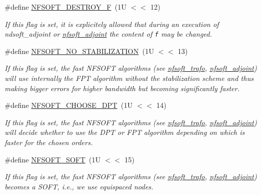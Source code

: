 \begin{CompactItemize}
\#define \hyperlink{group__nfsoft_g93ab283dcb14d5b37b130e2556bb6e7d}{NFSOFT\_\-DESTROY\_\-F}~(1U $<$$<$ 12)
\begin{CompactList}\small\item\em If this flag is set, it is explicitely allowed that during an execution of ndsoft\_\-adjoint or \hyperlink{group__nfsoft_g08395b1dd90f9a2565685d17460afc5b}{nfsoft\_\-adjoint} the content of {\tt f} may be changed. \item\end{CompactList}\item 
\#define \hyperlink{group__nfsoft_ge6c22599d21b5d8a8f144a39b49d3677}{NFSOFT\_\-NO\_\-STABILIZATION}~(1U $<$$<$ 13)
\begin{CompactList}\small\item\em If this flag is set, the fast NFSOFT algorithms (see \hyperlink{group__nfsoft_ge243cd75d7571a99eae53818e32355fb}{nfsoft\_\-trafo}, \hyperlink{group__nfsoft_g08395b1dd90f9a2565685d17460afc5b}{nfsoft\_\-adjoint}) will use internally the FPT algorithm without the stabilization scheme and thus making bigger errors for higher bandwidth but becoming significantly faster. \item\end{CompactList}\item 
\#define \hyperlink{group__nfsoft_g43ce16ed2d1893df2b997e637ccde4d4}{NFSOFT\_\-CHOOSE\_\-DPT}~(1U $<$$<$ 14)
\begin{CompactList}\small\item\em If this flag is set, the fast NFSOFT algorithms (see \hyperlink{group__nfsoft_ge243cd75d7571a99eae53818e32355fb}{nfsoft\_\-trafo}, \hyperlink{group__nfsoft_g08395b1dd90f9a2565685d17460afc5b}{nfsoft\_\-adjoint}) will decide whether to use the DPT or FPT algorithm depending on which is faster for the chosen orders. \item\end{CompactList}\item 
\#define \hyperlink{group__nfsoft_g07ad8a429e8451bd153563eedc3ef0bf}{NFSOFT\_\-SOFT}~(1U $<$$<$ 15)
\begin{CompactList}\small\item\em If this flag is set, the fast NFSOFT algorithms (see \hyperlink{group__nfsoft_ge243cd75d7571a99eae53818e32355fb}{nfsoft\_\-trafo}, \hyperlink{group__nfsoft_g08395b1dd90f9a2565685d17460afc5b}{nfsoft\_\-adjoint}) becomes a SOFT, i.e., we use equispaced nodes. \item\end{CompactList}\item 

\end{CompactItemize}
